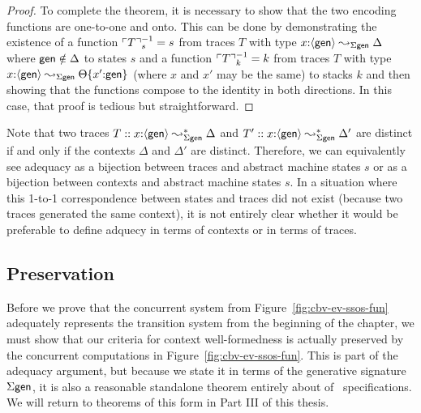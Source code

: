 \begin{proof}
To complete the theorem, it is necessary to show that the two encoding
functions are one-to-one and onto. This can be done by demonstrating
the existence of a function $^{-1}_s = s$ from traces $T$
with type $x{:} \leadsto_{\Sigma\sf gen} \Delta$ where
${\sf gen} \notin \Delta$ to states $s$ and a function
$^{-1}_k = k$ from traces $T$ with type $x{:}
\leadsto_{\Sigma\sf gen} $ (where $x$
and $x'$ may be the same) to stacks $k$ and then showing that
the functions compose to the identity in both directions. In this case,
that proof is tedious but straightforward.
\end{proof}

Note that two traces $T :: x{:} \leadsto^*_{\Sigma\sf
  gen} \Delta$ and $T' :: x{:} \leadsto^*_{\Sigma\sf
  gen} \Delta'$ are distinct if and only if the contexts $\Delta$ and
$\Delta'$ are distinct. Therefore, we can equivalently see adequacy as
a bijection between traces and abstract machine states $s$ or as a
bijection between contexts and abstract machine states $s$. In a
situation where this 1-to-1 correspondence between states and traces
did not exist (because two traces generated the same context), it is
not entirely clear whether it would be preferable to define adquecy in
terms of contexts or in terms of traces.

\subsection{Preservation}
\label{sec:nat-ssos-adequacy-pres}

Before we prove that the concurrent system from
Figure~\ref{fig:cbv-ev-ssos-fun} adequately represents the transition
system from the beginning of the chapter, we must show that our
criteria for context well-formedness is actually preserved by the
concurrent computations in Figure~\ref{fig:cbv-ev-ssos-fun}. This is
part of the adequacy argument, but because we state it in terms of the
generative signature $\Sigma\sf gen$, it is also a reasonable
standalone theorem entirely about of \sls~specifications. We will
return to theorems of this form in Part III of this thesis.

